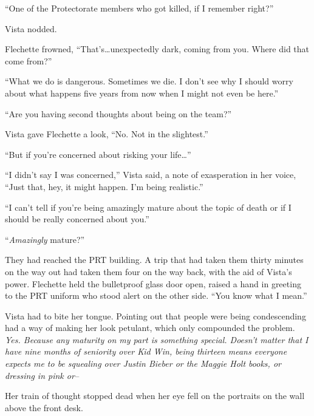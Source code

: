 ``One of the Protectorate members who got killed, if I remember right?''



Vista nodded.



Flechette frowned, ``That's\ldots unexpectedly dark, coming from you.  Where did that come from?''



``What we do is dangerous.  Sometimes we die.  I don't see why I should worry about what happens five years from now when I might not even be here.''



``Are you having second thoughts about being on the team?''



Vista gave Flechette a look, ``No.  Not in the slightest.''



``But if you're concerned about risking your life\ldots''



``I didn't say I was concerned,'' Vista said, a note of exasperation in her voice, ``Just that, hey, it might happen.  I'm being realistic.''



``I can't tell if you're being amazingly mature about the topic of death or if I should be really concerned about you.''



``\emph{Amazingly} mature?''



They had reached the PRT building.  A trip that had taken them thirty minutes on the way out had taken them four on the way back, with the aid of Vista's power.  Flechette held the bulletproof glass door open, raised a hand in greeting to the PRT uniform who stood alert on the other side.  ``You know what I mean.''



Vista had to bite her tongue. Pointing out that people were being condescending had a way of making her look petulant, which only compounded the problem.  \emph{Yes.  Because any maturity on my part is something special. Doesn't matter that I have nine months of seniority over Kid Win, being thirteen means everyone expects me to be squealing over Justin Bieber or the Maggie Holt books, or dressing in pink or--}



Her train of thought stopped dead when her eye fell on the portraits on the wall above the front desk.



